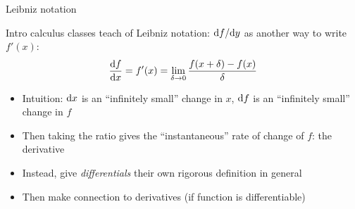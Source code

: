 \documentclass[8pt, aspectratio=149]{beamer}
\begin{document}
\begin{frame}{Leibniz notation}

    Intro calculus classes teach of Leibniz notation: \( \mathrm{d} f / \mathrm{d} y \) as another way to write \( f'(x) \): 
    \begin{align*}
        \frac{\mathrm{d} f}{\mathrm{d} x} = f'(x) 
        = \lim_{\delta \to 0} \frac{f(x + \delta) - f(x)}{\delta}
    \end{align*}
    \begin{itemize}
        \item Intuition: \( \mathrm{d} x \) is an ``infinitely small'' change in \( x \), \( \mathrm{d} f \) is an ``infinitely small'' change in \( f \) 
        \item Then taking the ratio gives the ``instantaneous'' rate of change of \( f \): the derivative     
    \end{itemize}

    \vspace{1em}
    \begin{itemize}
        \item Instead, give \textit{differentials} their own rigorous definition in general  
        \item Then make connection to derivatives (if function is differentiable) 
    \end{itemize} 

\end{frame}
\end{document}
